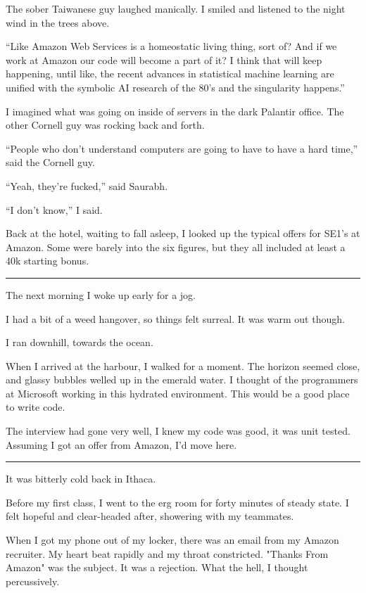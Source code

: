 The sober Taiwanese guy laughed manically.  I smiled and listened to the night
wind in the trees above.

``Like Amazon Web Services is a homeostatic living thing, sort of?  And if we
work at Amazon our code will become a part of it?  I think that will keep
happening, until like, the recent advances in statistical machine learning are
unified with the symbolic AI research of the 80's and the singularity happens.''

I imagined what was going on inside of servers in the dark Palantir office.  The
other Cornell guy was rocking back and forth.

``People who don't understand computers are going to have to have a hard time,''
said the Cornell guy.

``Yeah, they're fucked,'' said Saurabh.

``I don't know,'' I said.

Back at the hotel, waiting to fall asleep, I looked up the typical offers for
SE1's at Amazon.  Some were barely into the six figures, but they all included
at least a 40k starting bonus.

\plainfancybreak{12pt}{2}{* * *}

The next morning I woke up early for a jog.

I had a bit of a weed hangover, so things felt surreal.  It was warm out though.

I ran downhill, towards the ocean.

When I arrived at the harbour, I walked for a moment.  The horizon seemed close,
and glassy bubbles welled up in the emerald water.  I thought of the programmers
at Microsoft working in this hydrated environment.  This would be a good place
to write code.

The interview had gone very well, I knew my code was good, it was unit tested.
Assuming I got an offer from Amazon, I'd move here. 

\plainfancybreak{12pt}{2}{* * *}

It was bitterly cold back in Ithaca.

Before my first class, I went to the erg room for forty minutes of steady state.
I felt hopeful and clear-headed after, showering with my teammates.

When I got my phone out of my locker, there was an email from my Amazon
recruiter.  My heart beat rapidly and my throat constricted.  "Thanks From
Amazon" was the subject.  It was a rejection.  What the hell, I thought
percussively. 

